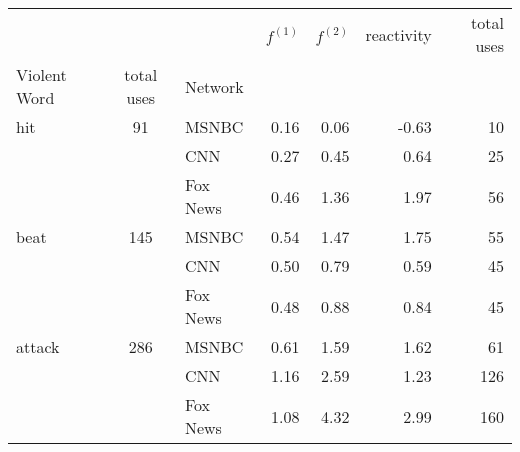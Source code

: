 \begin{tabular}{lclrrrr}
\toprule
       &  &   & $f^{(1)}$ & $f^{(2)}$ & reactivity & total uses \\
  Violent Word & total uses & Network &           &           &            &            \\
\midrule
hit & 91 & MSNBC &      0.16 &      0.06 &      -0.63 &         10 \\
     && CNN &      0.27 &      0.45 &       0.64 &         25 \\
     && Fox News &      0.46 &      1.36 &       1.97 &         56 \\
     \hline
beat & 145 & MSNBC &      0.54 &      1.47 &       1.75 &         55 \\
     && CNN &      0.50 &      0.79 &       0.59 &         45 \\
     && Fox News &      0.48 &      0.88 &       0.84 &         45 \\
     \hline
attack & 286 & MSNBC &      0.61 &      1.59 &       1.62 &         61 \\
     && CNN &      1.16 &      2.59 &       1.23 &        126 \\
     && Fox News &      1.08 &      4.32 &       2.99 &        160 \\
\bottomrule
\end{tabular}
